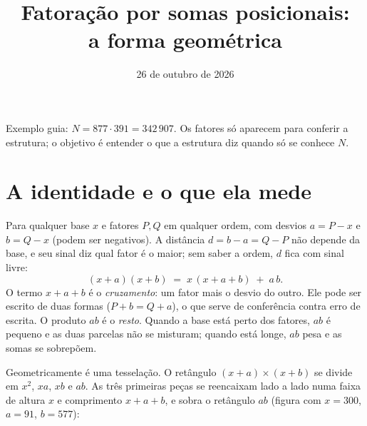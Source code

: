 \documentclass[11pt,a4paper]{article}
\title{Fatoração por somas posicionais:\\ a forma geométrica}
\date{26 de outubro de 2026}
\author{}
\newcommand{\N}{342\,907}
\begin{document}
\maketitle

\noindent Exemplo guia: $N = 877\cdot 391 = \N$. Os fatores só aparecem para conferir a estrutura; o objetivo é entender o que a estrutura diz quando só se conhece $N$.

\section{A identidade e o que ela mede}

Para qualquer base $x$ e fatores $P,Q$ em qualquer ordem, com desvios $a=P-x$ e $b=Q-x$ (podem ser negativos). A distância $d=b-a=Q-P$ não depende da base, e seu sinal diz qual fator é o maior; sem saber a ordem, $d$ fica com sinal livre:
\[
(x+a)(x+b) \;=\; x\,(x+a+b) \;+\; a\,b .
\]
O termo $x+a+b$ é o \emph{cruzamento}: um fator mais o desvio do outro. Ele pode ser escrito de duas formas ($P+b=Q+a$), o que serve de conferência contra erro de escrita. O produto $ab$ é o \emph{resto}. Quando a base está perto dos fatores, $ab$ é pequeno e as duas parcelas não se misturam; quando está longe, $ab$ pesa e as somas se sobrepõem.

Geometricamente é uma tesselação. O retângulo $(x+a)\times(x+b)$ se divide em $x^2$, $xa$, $xb$ e $ab$. As três primeiras peças se reencaixam lado a lado numa faixa de altura $x$ e comprimento $x+a+b$, e sobra o retângulo $ab$ (figura com $x=300$, $a=91$, $b=577$):
\end{document}
